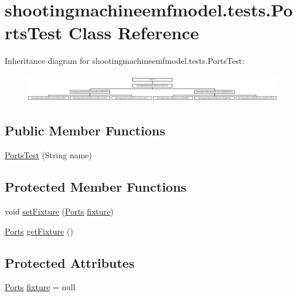 \hypertarget{classshootingmachineemfmodel_1_1tests_1_1_ports_test}{\section{shootingmachineemfmodel.\-tests.\-Ports\-Test Class Reference}
\label{classshootingmachineemfmodel_1_1tests_1_1_ports_test}
}
Inheritance diagram for shootingmachineemfmodel.\-tests.\-Ports\-Test\-:\begin{figure}[H]
\begin{center}
\leavevmode
\includegraphics[height=1.232123cm]{classshootingmachineemfmodel_1_1tests_1_1_ports_test}
\end{center}
\end{figure}
\subsection*{Public Member Functions}
\begin{DoxyCompactItemize}
\item 
\hyperlink{classshootingmachineemfmodel_1_1tests_1_1_ports_test_a33e451eb7a30c1f836d1b1943f3ef9aa}{Ports\-Test} (String name)
\end{DoxyCompactItemize}
\subsection*{Protected Member Functions}
\begin{DoxyCompactItemize}
\item 
void \hyperlink{classshootingmachineemfmodel_1_1tests_1_1_ports_test_acf0a6904a8c8fb03233ecd38ad05c2dc}{set\-Fixture} (\hyperlink{interfaceshootingmachineemfmodel_1_1_ports}{Ports} \hyperlink{classshootingmachineemfmodel_1_1tests_1_1_ports_test_a95d3c21f65f9a1cbc321ee5c99d3b20a}{fixture})
\item 
\hyperlink{interfaceshootingmachineemfmodel_1_1_ports}{Ports} \hyperlink{classshootingmachineemfmodel_1_1tests_1_1_ports_test_a77b6d240eddf546ca5e39490515de325}{get\-Fixture} ()
\end{DoxyCompactItemize}
\subsection*{Protected Attributes}
\begin{DoxyCompactItemize}
\item 
\hyperlink{interfaceshootingmachineemfmodel_1_1_ports}{Ports} \hyperlink{classshootingmachineemfmodel_1_1tests_1_1_ports_test_a95d3c21f65f9a1cbc321ee5c99d3b20a}{fixture} = null
\end{DoxyCompactItemize}



